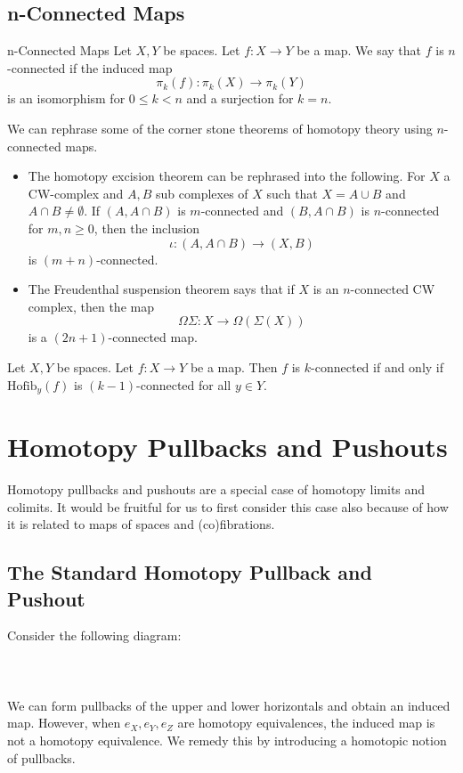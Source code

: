 \documentclass[a4paper]{article}
\begin{document}
\subsection{n-Connected Maps}
\begin{defn}{n-Connected Maps}{} Let $X,Y$ be spaces. Let $f:X\to Y$ be a map. We say that $f$ is $n$-connected if the induced map $$\pi_k(f):\pi_k(X)\to\pi_k(Y)$$ is an isomorphism for $0\leq k<n$ and a surjection for $k=n$. 
\end{defn}

We can rephrase some of the corner stone theorems of homotopy theory using $n$-connected maps. 
\begin{itemize}
\item The homotopy excision theorem can be rephrased into the following. For $X$ a CW-complex and $A,B$ sub complexes of $X$ such that $X=A\cup B$ and $A\cap B\neq\emptyset$. If $(A,A\cap B)$ is $m$-connected and $(B,A\cap B)$ is $n$-connected for $m,n\geq 0$, then the inclusion $$\iota:(A,A\cap B)\to(X,B)$$ is $(m+n)$-connected. 
\item The Freudenthal suspension theorem says that if $X$ is an $n$-connected CW complex, then the map $$\Omega\Sigma:X\to\Omega(\Sigma(X))$$ is a $(2n+1)$-connected map. 
\end{itemize}

\begin{prp}{}{} Let $X,Y$ be spaces. Let $f:X\to Y$ be a map. Then $f$ is $k$-connected if and only if $\text{Hofib}_y(f)$ is $(k-1)$-connected for all $y\in Y$. 
\end{prp}

\pagebreak
\section{Homotopy Pullbacks and Pushouts}
Homotopy pullbacks and pushouts are a special case of homotopy limits and colimits. It would be fruitful for us to first consider this case also because of how it is related to maps of spaces and (co)fibrations. 

\subsection{The Standard Homotopy Pullback and Pushout}
Consider the following diagram: \\~\\
\\~\\
We can form pullbacks of the upper and lower horizontals and obtain an induced map. However, when $e_X,e_Y,e_Z$ are homotopy equivalences, the induced map is not a homotopy equivalence. We remedy this by introducing a homotopic notion of pullbacks. 
\end{document}
